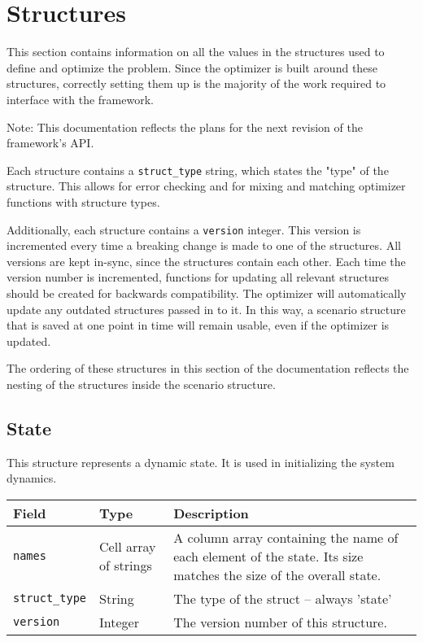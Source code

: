 \documentclass{article} %
\begin{document}
	\section{Structures}
		This section contains information on all the values in the structures used to define and optimize the problem.
		Since the optimizer is built around these structures, correctly setting them up is the majority of the work required to
		interface with the framework.

		Note: This documentation reflects the plans for the next revision of the framework's API.

		Each structure contains a \lstinline|struct_type| string, which states the "type" of the structure.
		This allows for error checking and for mixing and matching optimizer functions with structure types.

		Additionally, each structure contains a \lstinline|version| integer. This version is incremented every time a breaking
		change is made to one of the structures. All versions are kept in-sync, since the structures contain each other.
		Each time the version number is incremented, functions for updating all relevant structures should be created for backwards
		compatibility. The optimizer will automatically update any outdated structures passed in to it. In this way, a scenario structure
		that is saved at one point in time will remain usable, even if the optimizer is updated.

		The ordering of these structures in this section of the documentation reflects the nesting of the structures inside the scenario structure.

		\subsection{State}
			This structure represents a dynamic state. It is used in initializing the system dynamics.

			\vspace{\baselineskip}

			\begin{tabular}{ p{} | p{} | p{}}
				Field                   & Type    & Description                                                                       \\ \hline
				\lstinline|names|       & \raggedright Cell array of strings & A column array containing the name of each element of
				                                                  the state. Its size matches the size of the overall state.          \\[1ex]
				\lstinline|struct_type| & String  & The type of the struct -- always 'state'                                          \\
				\lstinline|version|     & Integer & The version number of this structure.                                             \\
			\end{tabular}
\end{document}
